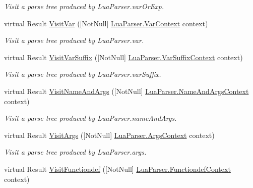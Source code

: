 \begin{DoxyCompactItemize}
\begin{DoxyCompactList}\small\item\em Visit a parse tree produced by Lua\+Parser.\+var\+Or\+Exp. \end{DoxyCompactList}\item 
virtual Result \mbox{\hyperlink{classzlua_1_1_lua_base_visitor_afdd236b54f45e1667274018d2ace456d}{Visit\+Var}} (\mbox{[}Not\+Null\mbox{]} \mbox{\hyperlink{classzlua_1_1_lua_parser_1_1_var_context}{Lua\+Parser.\+Var\+Context}} context)
\begin{DoxyCompactList}\small\item\em Visit a parse tree produced by Lua\+Parser.\+var. \end{DoxyCompactList}\item 
virtual Result \mbox{\hyperlink{classzlua_1_1_lua_base_visitor_a43417c615a3946d541cbecfec5d5a861}{Visit\+Var\+Suffix}} (\mbox{[}Not\+Null\mbox{]} \mbox{\hyperlink{classzlua_1_1_lua_parser_1_1_var_suffix_context}{Lua\+Parser.\+Var\+Suffix\+Context}} context)
\begin{DoxyCompactList}\small\item\em Visit a parse tree produced by Lua\+Parser.\+var\+Suffix. \end{DoxyCompactList}\item 
virtual Result \mbox{\hyperlink{classzlua_1_1_lua_base_visitor_a461a0315ce3a25873432dd1e9153bcc6}{Visit\+Name\+And\+Args}} (\mbox{[}Not\+Null\mbox{]} \mbox{\hyperlink{classzlua_1_1_lua_parser_1_1_name_and_args_context}{Lua\+Parser.\+Name\+And\+Args\+Context}} context)
\begin{DoxyCompactList}\small\item\em Visit a parse tree produced by Lua\+Parser.\+name\+And\+Args. \end{DoxyCompactList}\item 
virtual Result \mbox{\hyperlink{classzlua_1_1_lua_base_visitor_a63b313917c68dfb908b9e8217a2ed5c8}{Visit\+Args}} (\mbox{[}Not\+Null\mbox{]} \mbox{\hyperlink{classzlua_1_1_lua_parser_1_1_args_context}{Lua\+Parser.\+Args\+Context}} context)
\begin{DoxyCompactList}\small\item\em Visit a parse tree produced by Lua\+Parser.\+args. \end{DoxyCompactList}\item 
virtual Result \mbox{\hyperlink{classzlua_1_1_lua_base_visitor_ae443f2f4b5993febf577b31721ba8588}{Visit\+Functiondef}} (\mbox{[}Not\+Null\mbox{]} \mbox{\hyperlink{classzlua_1_1_lua_parser_1_1_functiondef_context}{Lua\+Parser.\+Functiondef\+Context}} context)

\end{DoxyCompactItemize}
